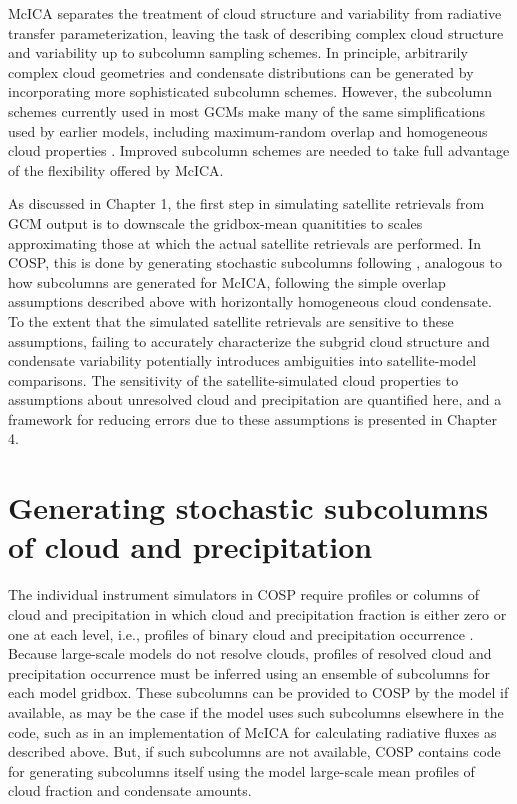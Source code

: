 McICA separates the treatment of cloud structure and variability from
radiative transfer parameterization, leaving the task of describing
complex cloud structure and variability up to subcolumn sampling
schemes. In principle, arbitrarily complex cloud geometries and
condensate distributions can be generated by incorporating more
sophisticated subcolumn schemes. However, the subcolumn schemes
currently used in most GCMs make many of the same simplifications used
by earlier models, including maximum-random overlap and homogeneous
cloud properties \citep[e.g.,][]{neale_et_al_2010a, neale_et_al_2010b}.
Improved subcolumn schemes are needed to take full advantage of the
flexibility offered by McICA.

As discussed in Chapter 1, the first step in simulating satellite
retrievals from GCM output is to downscale the gridbox-mean quanitities
to scales approximating those at which the actual satellite retrievals
are performed. In COSP, this is done by generating stochastic subcolumns
following \citet{klein_and_jakob_1999}, analogous to how subcolumns are
generated for McICA, following the simple overlap assumptions described
above with horizontally homogeneous cloud condensate. To the extent that
the simulated satellite retrievals are sensitive to these assumptions,
failing to accurately characterize the subgrid cloud structure and
condensate variability potentially introduces ambiguities into
satellite-model comparisons. The sensitivity of the satellite-simulated
cloud properties to assumptions about unresolved cloud and precipitation
are quantified here, and a framework for reducing errors due to these
assumptions is presented in Chapter 4.

\section{Generating stochastic subcolumns of cloud and
precipitation}\label{sec:subgrid1Scops}

The individual instrument simulators in COSP require profiles or columns
of cloud and precipitation in which cloud and precipitation fraction is
either zero or one at each level, i.e., profiles of binary cloud and
precipitation occurrence \citep{bodas-salcedo_et_al_2011}. Because
large-scale models do not resolve clouds, profiles of resolved cloud and
precipitation occurrence must be inferred using an ensemble of
subcolumns for each model gridbox. These subcolumns can be provided to
COSP by the model if available, as may be the case if the model uses
such subcolumns elsewhere in the code, such as in an implementation of
McICA for calculating radiative fluxes as described above. But, if such
subcolumns are not available, COSP contains code for generating
subcolumns itself using the model large-scale mean profiles of cloud
fraction and condensate amounts.

